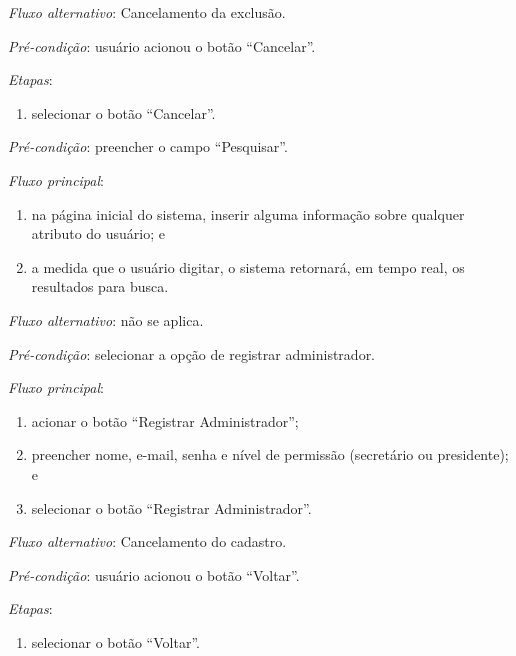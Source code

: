 \noindent \textit{Fluxo alternativo}: Cancelamento da exclusão.

\noindent \textit{Pré-condição}: usuário acionou o botão ``Cancelar''.

\noindent \textit{Etapas}:

\begin{enumerate}
    \item selecionar o botão ``Cancelar''.
\end{enumerate}


\vspace{0.7cm}

\noindent \textit{Pré-condição}: preencher o campo ``Pesquisar''.

\noindent \textit{Fluxo principal}:

\begin{enumerate}
    \item na página inicial do sistema, inserir alguma informação sobre qualquer atributo do usuário; e
    \item a medida que o usuário digitar, o sistema retornará, em tempo real, os resultados para busca.
\end{enumerate}

\noindent \textit{Fluxo alternativo}: não se aplica.


\vspace{0.7cm}

\noindent \textit{Pré-condição}: selecionar a opção de registrar administrador.

\noindent \textit{Fluxo principal}:

\begin{enumerate}
    \item acionar o botão ``Registrar Administrador'';
    \item preencher nome, e-mail, senha e nível de permissão (secretário ou presidente); e
    \item selecionar o botão ``Registrar Administrador''.
\end{enumerate}

\noindent \textit{Fluxo alternativo}: Cancelamento do cadastro.

\noindent \textit{Pré-condição}: usuário acionou o botão ``Voltar''.

\noindent \textit{Etapas}:

\begin{enumerate}
    \item selecionar o botão ``Voltar''.
\end{enumerate}

